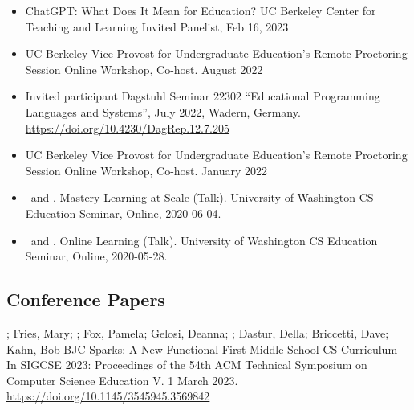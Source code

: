 \begin{itemize}
    \item{ChatGPT: What Does It Mean for Education? UC Berkeley Center for Teaching and Learning
    \newline
    Invited Panelist, Feb 16, 2023}
    
    \item{UC Berkeley Vice Provost for Undergraduate Education's Remote Proctoring Session
    \newline
    Online Workshop, Co-host. August 2022}
    
    \item{Invited participant Dagstuhl Seminar 22302
``Educational Programming Languages and Systems'', July 2022, Wadern, Germany.
    \newline  \small{\href{https://doi.org/10.4230/DagRep.12.7.205}{https://doi.org/10.4230/DagRep.12.7.205}}
    }
    
    \item{UC Berkeley Vice Provost for Undergraduate Education's Remote Proctoring Session
    \newline
    Online Workshop, Co-host. January 2022}

    \item{\me\ and \dan. Mastery Learning at Scale (Talk). University of Washington CS Education Seminar, Online, 2020-06-04.}

    \item{\me\ and \dan. Online Learning (Talk). University of Washington CS Education Seminar, Online, 2020-05-28.}
\end{itemize}

\subsection{Conference Papers}
\vspace{5pt}
\begin{etaremune}
    \setlength\itemsep{1em}
    \item{\dan; Fries, Mary; \me; Fox, Pamela;  Gelosi, Deanna; \lauren; Dastur, Della; Briccetti, Dave; Kahn, Bob
    \newline
    BJC Sparks: A New Functional-First Middle School CS Curriculum
    \newline In SIGCSE 2023: Proceedings of the 54th ACM Technical Symposium on Computer Science Education V. 1 March 2023.
    \newline
    \href{https://doi.org/10.1145/3545945.3569842}{https://doi.org/10.1145/3545945.3569842}}
\end{etaremune}

